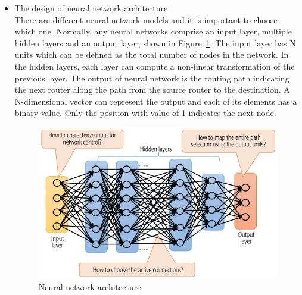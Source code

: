 \documentclass[11pt]{report}
\begin{document}
	\begin{itemize}
		\item The design of neural network architecture\\
		There are different neural network models and it is important to choose which one.
		Normally, any neural networks comprise an input layer, multiple hidden layers and an output layer, shown in Figure~\ref{3thfig}. The input layer has N units which can be defined as the total number of nodes in the network. In the hidden layers, each layer can compute a non-linear transformation of the previous layer. The output of neural network is the routing path indicating the next router along the path from the source router to the destination. A N-dimensional vector can represent the output and each of its elements has a binary value. Only the position with value of 1 indicates the next node. 
		\begin{figure}[h!]
			\centering
			\includegraphics[width=0.7\linewidth]{figure5.jpg}
			\caption{Neural network architecture}
			\label{3thfig}
		\end{figure}\\
	\end{itemize}
\end{document}
